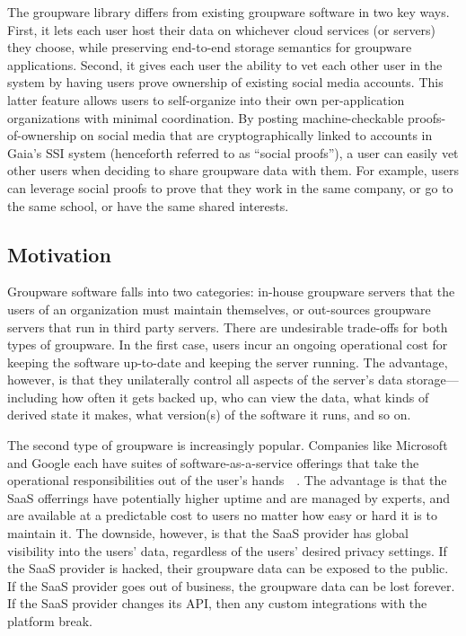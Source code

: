 The groupware library differs from existing groupware software in two key ways.
First, it lets each user host their data on whichever cloud services (or
servers) they choose, while preserving end-to-end storage semantics for
groupware applications.  Second, it gives each user the ability to vet each
other user in the system by having users prove ownership of existing social
media accounts.  This latter feature allows users to self-organize into their
own per-application organizations with minimal coordination.  By posting
machine-checkable proofs-of-ownership on social media that are cryptographically
linked to accounts in Gaia's SSI system (henceforth referred to as ``social
proofs''), a user can easily vet other users when deciding to share groupware
data with them.  For example, users can leverage social proofs to prove that
they work in the same company, or go to the same school, or have the same shared
interests.

\subsection{Motivation}

Groupware software falls into two categories:  in-house groupware servers that
the users of an organization must maintain themselves, or out-sources groupware
servers that run in third party servers.  There are undesirable 
trade-offs for both types of groupware.  In the first case, users incur an
ongoing operational cost for keeping the software up-to-date and keeping the
server running.  The advantage, however, is that they unilaterally control all
aspects of the server's data storage---including how often it gets backed up,
who can view the data, what kinds of derived state it makes, what version(s) of
the software it runs, and so on.

The second type of groupware is increasingly popular.  Companies like Microsoft
and Google each have suites of software-as-a-service offerings that take the
operational responsibilities out of the user's
hands~\cite{google-apps}~\cite{microsoft-apps}.  The advantage is that the
SaaS offerrings have potentially higher uptime and are managed by experts, and
are available at a predictable cost to users no matter how easy or hard it is to
maintain it.  The downside, however, is that the SaaS provider has global
visibility into the users' data, regardless of the users' desired privacy
settings.  If the SaaS provider is hacked, their groupware data can be exposed
to the public.  If the SaaS provider goes out of business, the groupware data
can be lost forever.  If the SaaS provider changes its API, then any custom
integrations with the platform break.

